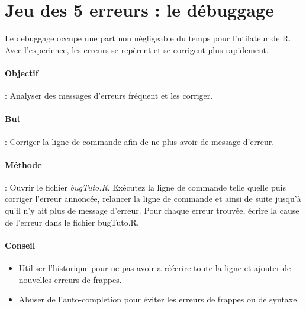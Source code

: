 
\section{Jeu des 5 erreurs : le débuggage}

%
Le debuggage occupe une part non négligeable du temps pour l'utilateur de R. Avec l'experience, les erreurs se repèrent et se corrigent plus rapidement.
\paragraph{Objectif }: Analyser des messages d'erreurs fréquent et les corriger. 
\paragraph{But} : Corriger la ligne de commande afin de ne plus avoir de message d'erreur.
\paragraph{Méthode} : Ouvrir le fichier \emph{bugTuto.R}. Exécutez la ligne de commande telle quelle  puis corriger l'erreur annoncée, relancer la ligne de commande et ainsi de suite jusqu'à qu'il n'y ait plus de message d'erreur. Pour chaque erreur trouvée, écrire la cause de l'erreur dans le fichier bugTuto.R.
\paragraph{Conseil} 
\begin{itemize}
	\item Utiliser l'historique pour ne pas avoir a réécrire toute la ligne et ajouter de nouvelles erreurs de frappes.
	\item Abuser de l'auto-completion pour éviter les erreurs de frappes ou de syntaxe.
\end{itemize}

